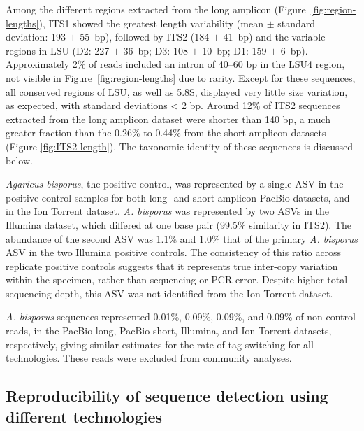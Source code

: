 \documentclass[
  12pt,
]{article}
\begin{document}
Among the different regions extracted from the long amplicon (Figure~\ref{fig:region-lengths}),
ITS1 showed the greatest length variability (mean \(\pm\) standard deviation: 193 \(\pm\) 55~bp), followed by ITS2 (184 \(\pm\) 41~bp) and the variable regions in LSU (D2: 227 \(\pm\) 36~bp; D3: 108 \(\pm\) 10~bp; D1: 159 \(\pm\) 6~bp).
Approximately 2\% of reads included an intron of 40--60 bp in the LSU4 region, not visible in Figure~\ref{fig:region-lengths} due to rarity.
Except for these sequences, all conserved regions of LSU, as well as 5.8S, displayed very little size variation, as expected, with standard deviations \textless{} 2 bp.
Around 12\% of ITS2 sequences extracted from the long amplicon dataset were shorter than 140 bp, a much greater fraction than the 0.26\% to 0.44\% from the short amplicon datasets (Figure \ref{fig:ITS2-length}).
The taxonomic identity of these sequences is discussed below.

\emph{Agaricus bisporus}, the positive control, was represented by a single ASV in the positive control samples for both long- and short-amplicon PacBio datasets, and in the Ion Torrent dataset.
\emph{A. bisporus} was represented by two ASVs in the Illumina dataset, which differed at one base pair (99.5\% similarity in ITS2).
The abundance of the second ASV was 1.1\% and 1.0\% that of the primary \emph{A. bisporus} ASV in the two Illumina positive controls.
The consistency of this ratio across replicate positive controls suggests that it represents true inter-copy variation within the specimen, rather than sequencing or PCR error.
Despite higher total sequencing depth, this ASV was not identified from the Ion Torrent dataset.

\emph{A. bisporus} sequences represented 0.01\%, 0.09\%, 0.09\%, and 0.09\% of non-control reads, in the PacBio long, PacBio short, Illumina, and Ion Torrent datasets, respectively, giving similar estimates for the rate of tag-switching for all technologies.
These reads were excluded from community analyses.

\hypertarget{reproducibility-of-sequence-detection-using-different-technologies}{%
\subsection{Reproducibility of sequence detection using different technologies}\label{reproducibility-of-sequence-detection-using-different-technologies}}
\end{document}
